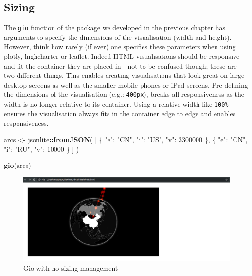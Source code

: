 \documentclass[
]{krantz}
\makeatletter
\newenvironment{Shaded}{\begin{snugshade}}{\end{snugshade}}
\newcommand{\KeywordTok}[1]{\textcolor[rgb]{0.27,0.27,0.27}{\textbf{#1}}}
\newcommand{\NormalTok}[1]{#1}
\newcommand{\OperatorTok}[1]{\textcolor[rgb]{0.43,0.43,0.43}{\textbf{#1}}}
\newcommand{\StringTok}[1]{\textcolor[rgb]{0.5,0.5,0.5}{#1}}
\newenvironment{kframe}{%
\medskip{}
\setlength{\fboxsep}{.8em}
 \def\at@end@of@kframe{}%
 \ifinner\ifhmode%
  \def\at@end@of@kframe{\end{minipage}}%
  \begin{minipage}{\columnwidth}%
 \fi\fi%
 \def\FrameCommand##1{\hskip\@totalleftmargin \hskip-\fboxsep
 \colorbox{shadecolor}{##1}\hskip-\fboxsep
     \hskip-\linewidth \hskip-\@totalleftmargin \hskip\columnwidth}%
 \MakeFramed {\advance\hsize-\width
   \@totalleftmargin\z@ \linewidth\hsize
   \@setminipage}}%
 {\par\unskip\endMakeFramed%
 \at@end@of@kframe}
\renewenvironment{Shaded}{\begin{kframe}}{\end{kframe}}
\makeatother
\begin{document}
\hypertarget{widgets-adv-sizing}{%
\subsection{Sizing}\label{widgets-adv-sizing}}

The \texttt{gio} function of the package we developed in the previous chapter has arguments to specify the dimensions of the visualisation (width and height). However, think how rarely (if ever) one specifies these parameters when using plotly, highcharter or leaflet. Indeed HTML visualisations should be responsive and fit the container they are placed in---not to be confused though; these are two different things. This enables creating visualisations that look great on large desktop screens as well as the smaller mobile phones or iPad screens. Pre-defining the dimensions of the visualisation (e.g.: \texttt{400px}), breaks all responsiveness as the width is no longer relative to its container. Using a relative width like \texttt{100\%} ensures the visualisation always fits in the container edge to edge and enables responsiveness.

\begin{Shaded}
\begin{Highlighting}[]
\NormalTok{arcs <{-}}\StringTok{ }\NormalTok{jsonlite}\OperatorTok{::}\KeywordTok{fromJSON}\NormalTok{(}
  \StringTok{\textquotesingle{}[}
\StringTok{    \{}
\StringTok{      "e": "CN",}
\StringTok{      "i": "US",}
\StringTok{      "v": 3300000}
\StringTok{    \},}
\StringTok{    \{}
\StringTok{      "e": "CN",}
\StringTok{      "i": "RU",}
\StringTok{      "v": 10000}
\StringTok{    \}}
\StringTok{  ]\textquotesingle{}}
\NormalTok{)}

\KeywordTok{gio}\NormalTok{(arcs)}
\end{Highlighting}
\end{Shaded}

\begin{figure}[t]

{\centering \includegraphics[width=1\linewidth]{images/gio-size-issue} 

}

\caption{Gio with no sizing management}\label{fig:gio-size-issue}
\end{figure}
\end{document}

